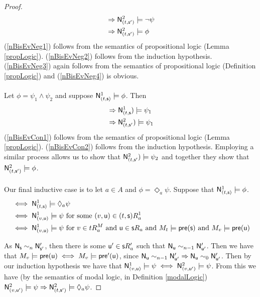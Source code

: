 \begin{proof}
\begin{align}
	& \Rightarrow \mathrm{\mathsf{N}}^2_{(t,\mathrm{\mathsf{s}}')} \models \neg \psi \label{nBisEvNeg3} \\
	& \Rightarrow \mathrm{\mathsf{N}}^2_{(t,\mathrm{\mathsf{s}}')} \models \phi \label{nBisEvNeg4}
\end{align}
(\ref{nBisEvNeg1}) follows from the semantics of propositional logic (Lemma \ref{propLogic}).
(\ref{nBisEvNeg2}) follows from the induction hypothesis.
(\ref{nBisEvNeg3}) again follows from the semantics of propositional logic (Definition
		\ref{propLogic}) and (\ref{nBisEvNeg4}) is obvious.\\
\\
Let $\phi = \psi_1 \land \psi_2$ and suppose $\mathrm{\mathsf{N}}^1_{(t,\mathrm{\mathsf{s}})} \models \phi$.
Then
\begin{align}
	& \Rightarrow \mathrm{\mathsf{N}}^1_{(t,\mathrm{\mathsf{s}}}) \models \psi_1 \label{nBisEvCon1} \\
	& \Rightarrow \mathrm{\mathsf{N}}^2_{(t,\mathrm{\mathsf{s}}'}) \models \psi_1 \label{nBisEvCon2}
\end{align}
(\ref{nBisEvCon1}) follows from the semantics of propositional logic (Lemma \ref{propLogic}).
(\ref{nBisEvCon2}) follows from the induction hypothesis.
Employing a similar process allows us to show that $\mathrm{\mathsf{N}}^2_{(t,\mathrm{\mathsf{s}}'}) \models \psi_2$ and together they 
show that $\mathrm{\mathsf{N}}^2_{(t,\mathrm{\mathsf{s}}')} \models \phi$.\\
\\
Our final inductive case is to let $a \in A$ and $\phi = \Diamond_a \psi$.
Suppose that $\mathrm{\mathsf{N}}^1_{(t,\mathrm{\mathsf{s}})} \models \phi$.
\begin{align}
	& \iff \mathrm{\mathsf{N}}^1_{(t,\mathrm{\mathsf{s}})} \models \Diamond_a \psi \label{nBisEvMod1} \\
	& \iff \mathrm{\mathsf{N}}^1_{(v,\mathrm{\mathsf{u}})} \models \psi \text{ for some $(v,\mathrm{\mathsf{u}}) \in (t,\mathrm{\mathsf{s}}) R^1_a$} \label{nBisEvMod2} \\
	& \iff \mathrm{\mathsf{N}}^1_{(v,\mathrm{\mathsf{u}})} \models \psi \text{ for $v \in t R^M_a$ and $\mathrm{\mathsf{u}} \in \mathrm{\mathsf{s}} R_a$ and $M_t \models
		\mathrm{\mathsf{pre}}(\mathrm{\mathsf{s}})$ and $M_v \models \mathrm{\mathsf{pre}}(\mathrm{\mathsf{u}})$} \label{nBisEvMod3} \\
\end{align}

As $\mathrm{\mathsf{N}}_\mathrm{\mathsf{s}} \sim_n \mathrm{\mathsf{N}}'_{\mathrm{\mathsf{s}}'}$, then there is some $\mathrm{\mathsf{u}}' \in \mathrm{\mathsf{s}} R'_a$ such that $\mathrm{\mathsf{N}}_\mathrm{\mathsf{u}} \sim_{n-1} \mathrm{\mathsf{N}}'_{\mathrm{\mathsf{u}}'}$.
Then we have that $M_v \models \mathrm{\mathsf{pre}}(\mathrm{\mathsf{u}}) \iff M_v \models \mathrm{\mathsf{pre}}'(\mathrm{\mathsf{u}})$, since $\mathrm{\mathsf{N}}_\mathrm{\mathsf{u}} \sim_{n-1} \mathrm{\mathsf{N}}'_{\mathrm{\mathsf{u}}'}
\Rightarrow \mathrm{\mathsf{N}}_\mathrm{\mathsf{u}} \sim_0 \mathrm{\mathsf{N}}'_{\mathrm{\mathsf{u}}'}$.
Then by our induction hypothesis we have that $\mathrm{\mathsf{N}}^1_{(v,\mathrm{\mathsf{u}})} \models \psi \iff \mathrm{\mathsf{N}}^2_{(v, \mathrm{\mathsf{u}}')} \models
\psi$.
From this we have (by the semantics of modal logic, in Definition \ref{modalLogic}) $\mathrm{\mathsf{N}}^2_{(v,\mathrm{\mathsf{u}}')}
\models \psi \Rightarrow \mathrm{\mathsf{N}}^2_{(t,\mathrm{\mathsf{s}}')} \models \Diamond_a \psi$.
\end{proof}

